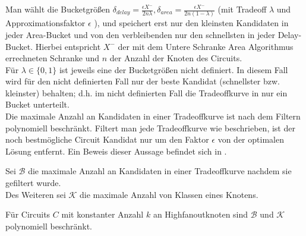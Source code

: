 \documentclass[11pt, a4paper, german]{article}
\begin{document}
Man wählt die Bucketgrößen $\delta_{delay} = \frac{\epsilon X^{-}}{2n\lambda}, \delta_{area} = \frac{\epsilon X^{-}}{2n(1-\lambda)}$ (mit Tradeoff $\lambda$ und Approximationsfaktor $\epsilon$ ), und speichert erst nur den kleinsten Kandidaten in jeder Area-Bucket und von den verbleibenden nur den schnellsten in jeder Delay-Bucket. Hierbei entspricht $X^-$ der mit dem Untere Schranke Area Algorithmus errechneten Schranke und $n$ der Anzahl der Knoten des Circuits. \\
Für $\lambda \in \{ 0,1 \}$ ist jeweils eine der Bucketgrößen nicht definiert. In diesem Fall wird für den nicht definierten Fall nur der beste Kandidat (schnellster bzw. kleinster) behalten; d.h. im nicht definierten Fall die Tradeoffkurve in nur ein Bucket unterteilt.\\
Die maximale Anzahl an Kandidaten in einer Tradeoffkurve ist nach dem Filtern polynomiell beschränkt. 
Filtert man jede Tradeoffkurve wie beschrieben, ist der noch bestmögliche Circuit Kandidat nur um den Faktor $\epsilon$ von der optimalen Lösung entfernt. Ein Beweis dieser Aussage befindet sich in \cite{Elbert}.
\begin{definition}
Sei $\mathcal{B}$ die maximale Anzahl an Kandidaten in einer Tradeoffkurve nachdem sie gefiltert wurde.\\
Des Weiteren sei $\mathcal{K}$ die maximale Anzahl von Klassen eines Knotens.
\end{definition}
\begin{cor}\label{cor:anzahl_klassen}
Für Circuits $C$ mit konstanter Anzahl $k$ an Highfanoutknoten sind $\mathcal{B}$ und $\mathcal{K}$ polynomiell beschränkt.
\end{cor}
\end{document}
